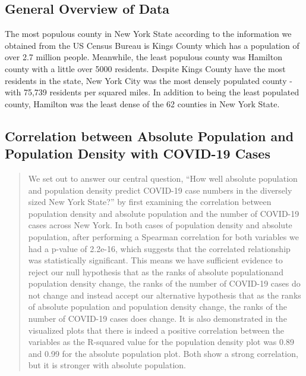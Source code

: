 \documentclass[
  12pt,
]{article}
\begin{document}
\hypertarget{general-overview-of-data}{%
\subsection{General Overview of Data}\label{general-overview-of-data}}

The most populous county in New York State according to the information
we obtained from the US Census Bureau is Kings County which has a
population of over 2.7 million people. Meanwhile, the least populous
county was Hamilton county with a little over 5000 residents. Despite
Kings County have the most residents in the state, New York City was the
most densely populated county - with 75,739 residents per squared miles.
In addition to being the least populated county, Hamilton was the least
dense of the 62 counties in New York State.

\hypertarget{correlation-between-absolute-population-and-population-density-with-covid-19-cases}{%
\subsection{Correlation between Absolute Population and Population
Density with COVID-19
Cases}\label{correlation-between-absolute-population-and-population-density-with-covid-19-cases}}

\begin{quote}
We set out to answer our central question, ``How well absolute
population and population density predict COVID-19 case numbers in the
diversely sized New York State?'' by first examining the correlation
between population density and absolute population and the number of
COVID-19 cases across New York. In both cases of population density and
absolute population, after performing a Spearman correlation for both
variables we had a p-value of 2.2e-16, which suggests that the
correlated relationship was statistically significant. This means we
have sufficient evidence to reject our null hypothesis that as the ranks
of absolute populationand population density change, the ranks of the
number of COVID-19 cases do not change and instead accept our
alternative hypothesis that as the ranks of absolute population and
population density change, the ranks of the number of COVID-19 cases
does change. It is also demonstrated in the visualized plots that there
is indeed a positive correlation between the variables as the R-squared
value for the population density plot was 0.89 and 0.99 for the absolute
population plot. Both show a strong correlation, but it is stronger with
absolute population.
\end{quote}
\end{document}
